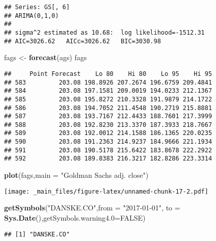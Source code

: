 \documentclass[]{book}
\newenvironment{Shaded}{\begin{snugshade}}{\end{snugshade}}
\newcommand{\DataTypeTok}[1]{\textcolor[rgb]{0.13,0.29,0.53}{#1}}
\newcommand{\KeywordTok}[1]{\textcolor[rgb]{0.13,0.29,0.53}{\textbf{#1}}}
\newcommand{\NormalTok}[1]{#1}
\newcommand{\OtherTok}[1]{\textcolor[rgb]{0.56,0.35,0.01}{#1}}
\newcommand{\StringTok}[1]{\textcolor[rgb]{0.31,0.60,0.02}{#1}}
\begin{document}
\begin{verbatim}
## Series: GS[, 6] 
## ARIMA(0,1,0) 
## 
## sigma^2 estimated as 10.68:  log likelihood=-1512.31
## AIC=3026.62   AICc=3026.62   BIC=3030.98
\end{verbatim}

\begin{Shaded}
\begin{Highlighting}[]
\NormalTok{fags <-}\StringTok{ }\KeywordTok{forecast}\NormalTok{(ags)}
\NormalTok{fags}
\end{Highlighting}
\end{Shaded}

\begin{verbatim}
##     Point Forecast    Lo 80    Hi 80    Lo 95    Hi 95
## 583         203.08 198.8926 207.2674 196.6759 209.4841
## 584         203.08 197.1581 209.0019 194.0233 212.1367
## 585         203.08 195.8272 210.3328 191.9879 214.1722
## 586         203.08 194.7052 211.4548 190.2719 215.8881
## 587         203.08 193.7167 212.4433 188.7601 217.3999
## 588         203.08 192.8230 213.3370 187.3933 218.7667
## 589         203.08 192.0012 214.1588 186.1365 220.0235
## 590         203.08 191.2363 214.9237 184.9666 221.1934
## 591         203.08 190.5178 215.6422 183.8678 222.2922
## 592         203.08 189.8383 216.3217 182.8286 223.3314
\end{verbatim}

\begin{Shaded}
\begin{Highlighting}[]
\KeywordTok{plot}\NormalTok{(fags,}\DataTypeTok{main =} \StringTok{"Goldman Sachs adj. close"}\NormalTok{)}
\end{Highlighting}
\end{Shaded}

\texttt{[image: \_main\_files/figure-latex/unnamed-chunk-17-2.pdf]}

\begin{Shaded}
\begin{Highlighting}[]
\KeywordTok{getSymbols}\NormalTok{(}\StringTok{"DANSKE.CO"}\NormalTok{,}\DataTypeTok{from =} \StringTok{"2017-01-01"}\NormalTok{, }\DataTypeTok{to =} \KeywordTok{Sys.Date}\NormalTok{(),}\DataTypeTok{getSymbols.warning4.0=}\OtherTok{FALSE}\NormalTok{)}
\end{Highlighting}
\end{Shaded}

\begin{verbatim}
## [1] "DANSKE.CO"
\end{verbatim}
\end{document}
